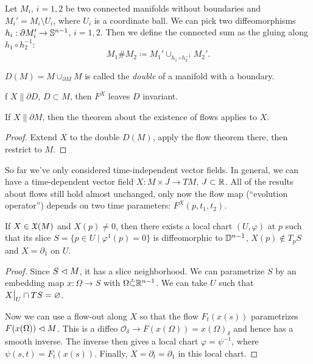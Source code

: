 \begin{defn}
    Let $M_i$, $i=1,2$ be two connected manifolds without boundaries and $M_i'=M_i\setminus U_i$, where $U_i$ is a coordinate ball. We can pick two diffeomorphisms $h_i:\partial M_i'\to \mathbb{S}^{n-1}$, $i=1,2$. Then we define the connected sum as the gluing along $h_1\circ h_2^{-1}$:
    \[M_1 \# M_2\coloneqq M_1'\cup_{h_1\circ h_2^{-1}}M_2'.\]
\end{defn}
\begin{example}
    $D(M)=M\cup_{\partial M}M$ is called the \emph{double} of a manifold with a boundary.
\end{example}
\begin{example}
    f $X\parallel \partial D$, $D\subset M$, then $F^X$ leaves $D$ invariant.
\end{example}
\begin{cor}
    If $X\parallel \partial M$, then the theorem about the existence of flows applies to $X$.
\end{cor}
\begin{proof}
    Extend $X$ to the double $D(M)$, apply the flow theorem there, then restrict to $M$.
\end{proof}
\begin{example}
So far we've only considered time-independent vector fields. In general, we can have a time-dependent vector field $X:M\times J\to TM$, $J\subset\mathbb{R} $. All of the results about flows still hold almost unchanged, only now the flow map (``evolution operator'') depends on two time parameters: $F^X(p,t_1,t_2)$.
\end{example}

\begin{thm}\label{rectification}
If $X\in\mathfrak{X}(M)$ and $X(p)\neq 0$, then there exists a local chart $(U,\varphi)$ at $p$ such that its slice $S=\{p\in U\mid \varphi^1(p)=0\}$ is diffeomorphic to $\mathbb{D}^{n-1}$, $X(p)\notin T_p S$ and $X=\partial_1$ on $U$.
\end{thm}
\begin{proof}
Since $S\vartriangleleft M$, it has a slice neighborhood. We can parametrize $S$ by an embedding map $x:\Omega\to S$ with $\Omega\mathring{\subset}\mathbb{R}^{n-1}$. We can take $U$ such that $\restr{X}{U}\cap TS=\varnothing$. 

Now we can use a flow-out along $X$ so that the flow $F_t(x(s))$ parametrizes $F(x(\Omega))\vartriangleleft M$. This is a diffeo $\mathcal{O}_\delta\to F(x(\Omega))=x(\Omega)_\delta$ and hence has a smooth inverse. The inverse then gives a local chart $\varphi=\psi^{-1}$, where $\psi(s,t)=F_t(x(s))$. Finally, $X=\partial_t=\partial_1$ in this local chart.
\end{proof}

